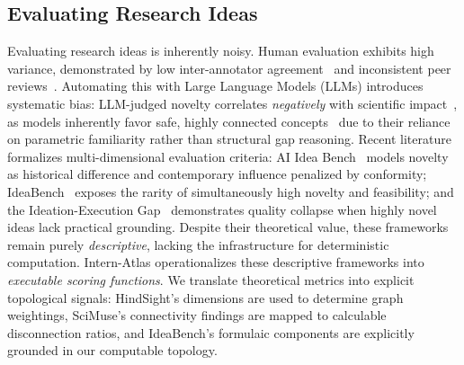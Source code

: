 \documentclass{llmxive}
\begin{document}
\subsection{Evaluating Research Ideas}
Evaluating research ideas is inherently noisy. Human evaluation exhibits high variance, demonstrated by low inter-annotator agreement~\cite{si2024can} and inconsistent peer reviews~\cite{beygelzimer2023has}. Automating this with Large Language Models (LLMs) introduces systematic bias: LLM-judged novelty correlates \textit{negatively} with scientific impact~\cite{latimer2025hindsight}, as models inherently favor safe, highly connected concepts~\cite{gu2024generation} due to their reliance on parametric familiarity rather than structural gap reasoning. 
Recent literature formalizes multi-dimensional evaluation criteria: AI Idea Bench~\cite{qiu2025ai} models novelty as historical difference and contemporary influence penalized by conformity; IdeaBench~\cite{guo2025ideabench} exposes the rarity of simultaneously high novelty and feasibility; and the Ideation-Execution Gap~\cite{si2025ideation} demonstrates quality collapse when highly novel ideas lack practical grounding. Despite their theoretical value, these frameworks remain purely \textit{descriptive}, lacking the infrastructure for deterministic computation.
{Intern-Atlas} operationalizes these descriptive frameworks into \textit{executable scoring functions}. We translate theoretical metrics into explicit topological signals: HindSight's dimensions are used to determine graph weightings, SciMuse's connectivity findings are mapped to calculable disconnection ratios, and IdeaBench's formulaic components are explicitly grounded in our computable topology.
\end{document}
